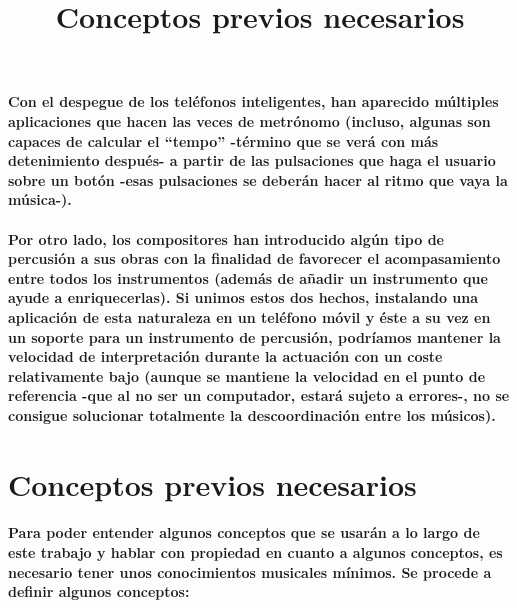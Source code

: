 \paragraph{
Con el despegue de los teléfonos inteligentes, han aparecido múltiples aplicaciones que hacen las veces de metrónomo (incluso, algunas son capaces de calcular el “tempo” -término que se verá con más detenimiento después- a partir de las pulsaciones que haga el usuario sobre un botón -esas pulsaciones se deberán hacer al ritmo que vaya la música-).
}

\paragraph{
Por otro lado, los compositores han introducido algún tipo de percusión a sus obras con la finalidad de favorecer el acompasamiento entre todos los instrumentos (además de añadir un instrumento que ayude a enriquecerlas). Si unimos estos dos hechos, instalando una aplicación de esta naturaleza en un teléfono móvil y éste a su vez en un soporte para un instrumento de percusión, podríamos mantener la velocidad de interpretación durante la actuación con un coste relativamente bajo (aunque se mantiene la velocidad en el punto de referencia -que al no ser un computador, estará sujeto a errores-, no se consigue solucionar totalmente la descoordinación entre los músicos).
}

\title{Conceptos previos necesarios}
\section{Conceptos previos necesarios}
\paragraph{
Para poder entender algunos conceptos que se usarán a lo largo de este trabajo y hablar con propiedad en cuanto a algunos conceptos, es necesario tener unos conocimientos musicales mínimos. Se procede a definir algunos conceptos:
}

